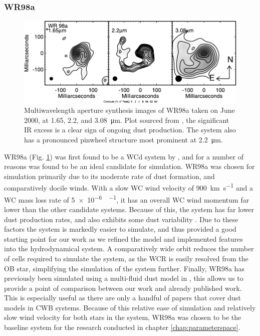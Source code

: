 \subsubsection{WR98a}

\begin{figure}[h]
  \centering
  \includegraphics{assets/systems/wr98a-monnier2007.pdf}
  \caption[\textit{Multiwavelength image of WR98a \parencite{monnierKeckAperturemaskingExperiment2007}}]{Multiwavelength aperture synthesis images of WR98a taken on June  2000, at 1.65, 2.2, and \SI{3.08}{\micro\metre}. Plot sourced from \textcite{monnierKeckAperturemaskingExperiment2007}, the significant IR excess is a clear sign of ongoing dust production. The system also has a pronounced pinwheel structure most prominent at \SI{2.2}{\micro\metre}.}
  \label{fig:wr98aimage}
\end{figure}


WR98a (Fig. \ref{fig:wr98aimage}) was first found to be a WCd system by \textcite{monnierPinwheelNebulaWR1999}, and for a number of reasons was found to be an ideal candidate for simulation.
WR98a was chosen for simulation primarily due to its moderate rate of dust formation, and comparatively docile winds.
With a slow WC wind velocity of \SI{900}{\kilo\metre\per\second} and a WC mass loss rate of \SI{5e-6}{\solarmass\per\year}, it has an overall WC wind momentum far lower than the other candidate systems.
Because of this, the system has far lower dust production rates, and also exhibits some dust variability \parencite{lauRevisitingImpactDust2020}.
Due to these factors the system is markedly easier to simulate, and thus provided a good starting point for our work as we refined the model and implemented features into the hydrodynamical system.
A comparatively wide orbit reduces the number of cells required to simulate the system, as the WCR is easily resolved from the OB star, simplifying the simulation of the system further.
Finally, WR98a has previously been simulated using a multi-fluid dust model in \textcite{hendrix_pinwheels_2016}, this allows us to provide a point of comparison between our work and already published work.
This is especially useful as there are only a handful of papers that cover dust models in CWB systems.
Because of this relative ease of simulation and relatively slow wind velocity for both stars in the system, WR98a was chosen to be the baseline system for the research conducted in chapter \ref{chap:parameterspace}.

